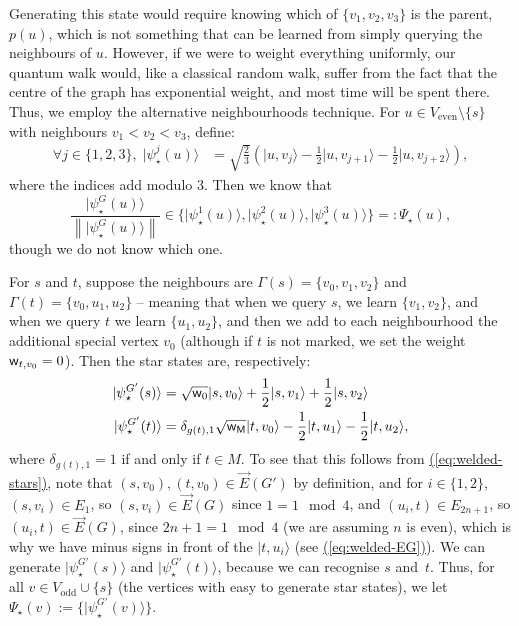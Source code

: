 \documentclass{article}
\newcommand{\eq}[1]{\hyperref[eq:#1]{(\ref*{eq:#1})}}
\def\ket#1{{\lvert}#1\rangle}
\renewcommand{\>}{\rangle}
\newcommand{\<}{\langle}
\renewcommand{\(}{\left(}
\renewcommand{\)}{\right)}
\def\norm#1{\left\| #1 \right\|}
\def\w{{\sf w}}
\begin{document}
Generating this state would require knowing which of $\{v_1,v_2,v_3\}$ is the parent, $p(u)$, which is not something that can be learned from simply querying the neighbours of $u$. However, if we were to weight everything uniformly, our quantum walk would, like a classical random walk, suffer from the fact that the centre of the graph has exponential weight, and most time will be spent there. Thus, we employ the alternative neighbourhoods technique. 
For $u\in V_{\mathrm{even}}\setminus\{s\}$ with neighbours $v_1<v_2<v_3$, define:
\begin{equation}
\begin{split}
\forall j\in\{1,2,3\},\; \ket{\psi_\star^j(u)} &= \sqrt{\frac{2}{3}}\left(\ket{u,v_j}-\frac{1}{2}\ket{u,v_{j+1}}-\frac{1}{2}\ket{u,v_{j+2}}\right),
\end{split}\label{eq:welded-alt-neighbourhood}
\end{equation}
where the indices add modulo 3. Then we know that 
$$\frac{\ket{\psi_\star^G(u)}}{\norm{\ket{\psi_\star^G(u)}}}\in \{\ket{\psi_\star^1(u)},\ket{\psi_\star^2(u)},\ket{\psi_\star^3(u)}\}=:\Psi_\star(u),$$
though we do not know which one. 

For $s$ and $t$, suppose the neighbours are $\Gamma(s)=\{v_0,v_1,v_2\}$ and $\Gamma(t)=\{v_0,u_1,u_2\}$ -- meaning that when we query $s$, we learn $\{v_1,v_2\}$, and when we query $t$ we learn $\{u_1,u_2\}$, and then we add to each neighbourhood the additional special vertex $v_0$ (although if $t$ is not marked, we set the weight $\w_{t,v_0}=0$). 
Then the star states are, respectively:
\begin{equation}
\begin{split}
\ket{\psi_\star^{G'}(s)} &= \sqrt{\w_0}\ket{s,v_0}+\frac{1}{2}\ket{s,v_1}+\frac{1}{2}\ket{s,v_2}\\
\ket{\psi_\star^{G'}(t)} &= \delta_{g(t),1}\sqrt{\w_{\sf M}}\ket{t,v_0}-\frac{1}{2}\ket{t,u_1}-\frac{1}{2}\ket{t,u_2},
\end{split}\label{eq:welded-st-stars}
\end{equation}
where $\delta_{g(t),1}=1$ if and only if $t\in M$. To see that this follows from \eq{welded-stars}, note that $(s,v_0),(t,v_0)\in \overrightarrow{E}(G')$ by definition, and for $i\in\{1,2\}$, $(s,v_i)\in E_1$, so $(s,v_i)\in \overrightarrow{E}(G)$ since $1=1\mod 4$, and $(u_i,t)\in E_{2n+1}$, so $(u_i,t)\in\overrightarrow{E}(G)$, since $2n+1=1\mod 4$ (we are assuming $n$ is even), which is why we have minus signs in front of the $\ket{t,u_i}$
(see \eq{welded-EG}).
We can generate $\ket{\psi_\star^{G'}(s)}$ and $\ket{\psi_\star^{G'}(t)}$, because we can recognise $s$ and~$t$. Thus, for all $v\in  V_{\mathrm{odd}}\cup\{s\}$ (the vertices with easy to generate star states), we let $\Psi_\star(v):=\{\ket{\psi_\star^{G'}(v)}\}$. 
\end{document}
